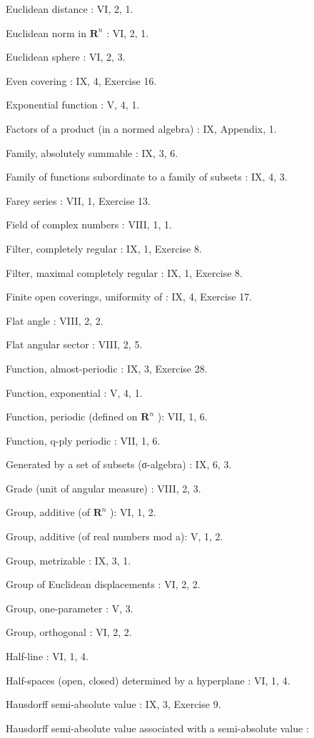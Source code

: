 Euclidean distance : VI, 2, 1.

Euclidean norm in \(\mathbf{R}^n\) : VI, 2, 1.

Euclidean sphere : VI, 2, 3.

Even covering : IX, 4, Exercise 16.

Exponential function : V, 4, 1.

Factors of a product (in a normed algebra) : IX, Appendix, 1.

Family, absolutely summable : IX, 3, 6.

Family of functions subordinate to a family of subsets : IX, 4, 3.

Farey series : VII, 1, Exercise 13.

Field of complex numbers : VIII, 1, 1.

Filter, completely regular : IX, 1, Exercise 8.

Filter, maximal completely regular : IX, 1, Exercise 8.

Finite open coverings, uniformity of : IX, 4, Exercise 17.

Flat angle : VIII, 2, 2.

Flat angular sector : VIII, 2, 5.

Function, almost-periodic : IX, 3, Exercise 28.

Function, exponential : V, 4, 1.

Function, periodic (defined on \(\mathbf{R}^n\) ): VII, 1, 6.

Function, q-ply periodic : VII, 1, 6.

Generated by a set of subsets (σ-algebra) : IX, 6, 3.

Grade (unit of angular measure) : VIII, 2, 3.

Group, additive (of \(\mathbf{R}^n\) ): VI, 1, 2.

Group, additive (of real numbers mod a): V, 1, 2.

Group, metrizable : IX, 3, 1.

Group of Euclidean displacements : VI, 2, 2.

Group, one-parameter : V, 3.

Group, orthogonal : VI, 2, 2.

Half-line : VI, 1, 4.

Half-spaces (open, closed) determined by a hyperplane : VI, 1, 4.

Hausdorff semi-absolute value : IX, 3, Exercise 9.

Hausdorff semi-absolute value associated with a semi-absolute value :

